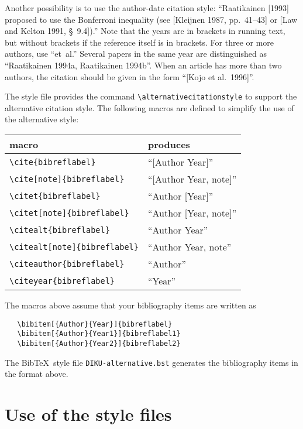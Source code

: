 \documentclass{DIKU-article}[2006/05/09]
\begin{document}
Another possibility is to use the author-date citation style:
``Raatikainen [1993] proposed to use the Bonferroni inequality (see
[Kleijnen 1987, pp.~41--43] or [Law and Kelton 1991, \S~9.4]).''  Note
that the years are in brackets in running text, but without brackets
if the reference itself is in brackets.  For three or more authors,
use ``et~al.''  Several papers in the same year are distinguished as
``Raatikainen 1994a, Raatikainen 1994b''.  When an article has more
than two authors, the citation should be given in the form ``[Kojo et
  al.\ 1996]''.

The style file provides the command \verb|\alternativecitationstyle|
to support the alternative citation style.
The following macros are defined to simplify the use of the
alternative style:

\begin{center}\begin{tabular}{ll}
\hline
 macro & produces\\ \hline
 \verb|\cite{bibreflabel}| & ``[Author Year]''\\ 
 \verb|\cite[note]{bibreflabel}| & ``[Author Year, note]''\\ 
 \verb|\citet{bibreflabel}| & ``Author [Year]''\\ 
 \verb|\citet[note]{bibreflabel}| & ``Author [Year, note]''\\ 
 \verb|\citealt{bibreflabel}| & ``Author Year''\\ 
 \verb|\citealt[note]{bibreflabel}| & ``Author Year, note''\\ 
 \verb|\citeauthor{bibreflabel}| & ``Author''\\ 
 \verb|\citeyear{bibreflabel}| & ``Year''\\ 
\hline
\end{tabular}\end{center}

\noindent
The macros above assume that your bibliography items are written as
\begin{verbatim}
   \bibitem[{Author}{Year}]{bibreflabel}
   \bibitem[{Author}{Year1}]{bibreflabel1}
   \bibitem[{Author}{Year2}]{bibreflabel2}
\end{verbatim}
The Bib\TeX\ style file \texttt{DIKU-alternative.bst} generates
the bibliography items in the format above.

\section{Use of the style files}
\end{document}
